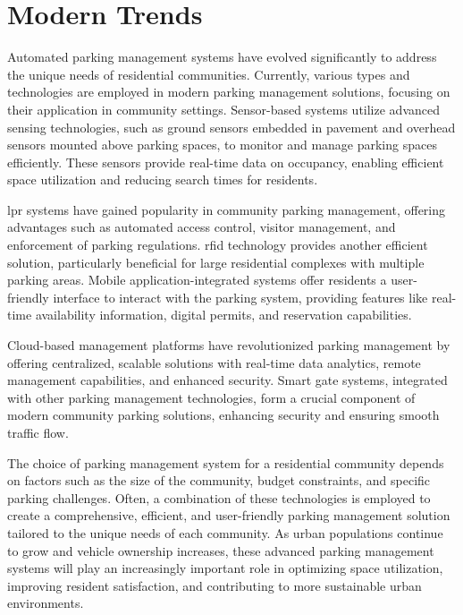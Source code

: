 \chapter{Modern Trends}\label{ch:modern_trends}

Automated parking management systems have evolved significantly to address the unique needs of residential communities. Currently, various types and technologies are employed in modern parking management solutions, focusing on their application in community settings. Sensor-based systems utilize advanced sensing technologies, such as ground sensors embedded in pavement and overhead sensors mounted above parking spaces, to monitor and manage parking spaces efficiently. These sensors provide real-time data on occupancy, enabling efficient space utilization and reducing search times for residents.

\gls{lpr} systems have gained popularity in community parking management, offering advantages such as automated access control, visitor management, and enforcement of parking regulations. \gls{rfid} technology provides another efficient solution, particularly beneficial for large residential complexes with multiple parking areas. Mobile application-integrated systems offer residents a user-friendly interface to interact with the parking system, providing features like real-time availability information, digital permits, and reservation capabilities.

Cloud-based management platforms have revolutionized parking management by offering centralized, scalable solutions with real-time data analytics, remote management capabilities, and enhanced security. Smart gate systems, integrated with other parking management technologies, form a crucial component of modern community parking solutions, enhancing security and ensuring smooth traffic flow.

The choice of parking management system for a residential community depends on factors such as the size of the community, budget constraints, and specific parking challenges. Often, a combination of these technologies is employed to create a comprehensive, efficient, and user-friendly parking management solution tailored to the unique needs of each community. As urban populations continue to grow and vehicle ownership increases, these advanced parking management systems will play an increasingly important role in optimizing space utilization, improving resident satisfaction, and contributing to more sustainable urban environments.
